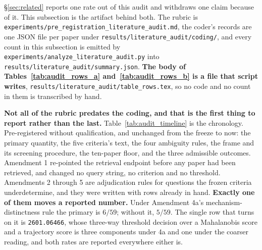 \documentclass{article}
\begin{document}
\noindent §\ref{sec:related} reports one rate out of this audit and withdraws one claim because of it. This subsection is the artifact behind both. The rubric is \texttt{experiments/\allowbreak pre\_registration\_literature\_audit.md}, the coder's records are one JSON file per paper under \texttt{results/\allowbreak literature\_audit/\allowbreak coding/}, and every count in this subsection is emitted by \texttt{experiments/\allowbreak analyze\_literature\_audit.py} into \texttt{results/\allowbreak literature\_audit/\allowbreak summary.json}. \textbf{The body of Tables~\ref{tab:audit_rows_a} and~\ref{tab:audit_rows_b} is a file that script writes}, \texttt{results/\allowbreak literature\_audit/\allowbreak table\_rows.tex}, so no code and no count in them is transcribed by hand.

\textbf{Not all of the rubric predates the coding, and that is the first thing to report rather than the last.} Table~\ref{tab:audit_timeline} is the chronology. Pre-registered without qualification, and unchanged from the freeze to now: the primary quantity, the five criteria's text, the four ambiguity rules, the frame and its screening procedure, the ten-paper floor, and the three admissible outcomes. Amendment 1 re-pointed the retrieval endpoint before any paper had been retrieved, and changed no query string, no criterion and no threshold. Amendments 2 through 5 are adjudication rules for questions the frozen criteria underdetermine, and they were written with rows already in hand. \textbf{Exactly one of them moves a reported number.} Under Amendment 4a's mechanism-distinctness rule the primary is $6/59$; without it, $5/59$. The single row that turns on it is \texttt{2601.06466}, whose three-way threshold decision over a Mahalanobis score and a trajectory score is three components under 4a and one under the coarser reading, and both rates are reported everywhere either is.
\end{document}
